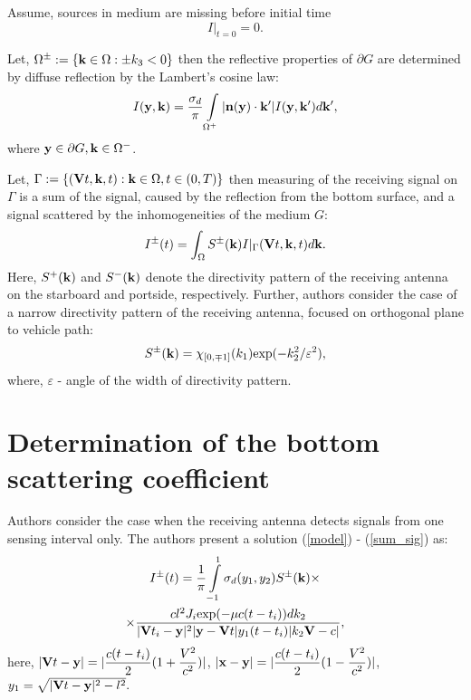 \documentclass{procDDs}
\begin{document}
Assume, sources in medium are missing before initial time
\begin{equation}
	\label{init_cond}
	I\rvert_{t=0}=0.
\end{equation}

Let, $\Omega^\pm := \{\mathbf{k} \in \Omega: \pm k_3 < 0\}$ then the reflective properties of $\partial G$  are determined by diffuse reflection by the Lambert’s cosine law:
\begin{equation}
	\label{boundary_condition}
	I(\mathbf{y},\mathbf{k}) = \frac{\sigma_d}{\pi} \int\limits_{\Omega ^+}|\mathbf{n}(\mathbf{y})\cdot \mathbf{k}'| I(\mathbf{y},\mathbf{k}') d\mathbf{k}' ,
\end{equation}
where  $\mathbf{y} \in \partial G, \mathbf{k} \in \Omega^-$.


Let, $\Gamma := \{ (\mathbf{V}t, \mathbf{k}, t): \mathbf{k} \in \Omega, t \in (0,T) \}$  then measuring of the receiving signal on $\Gamma$ is a sum of the signal, caused by the reflection from the bottom surface, and a signal scattered by the inhomogeneities of the medium $G$:
\begin{multline}
	\label{sum_sig}
	I^\pm(t) = \int_{\Omega} S^\pm(\mathbf{k}) I|_{\Gamma}(\mathbf{V}t, \mathbf{k}, t)d\mathbf{k}.
\end{multline}
Here, $S^+(\mathbf{k})$ and $S^-(\mathbf{k})$ denote the directivity pattern of the receiving antenna on the starboard and portside, respectively. Further, authors consider the case of a narrow directivity pattern of the receiving antenna, focused on orthogonal plane to vehicle path:
\begin{equation}
\label{diagram}
S^\pm(\mathbf{k}) = \chi_{[0,\mp1]}(k_1)  \text{exp}(-k_2^2/\varepsilon^2),
\end{equation}
where, $\varepsilon $ - angle of the width of directivity pattern.

\section{Determination of the bottom scattering coefficient}

Authors consider the case when the receiving antenna detects signals from one sensing interval only. 
The authors present a solution (\ref{model}) - (\ref{sum_sig}) as:
\begin{multline}
	I^\pm(t) = \frac{1}{\pi}\int\limits_{-1}^{1}\sigma_d(y_1,y_2) S^{\pm}(\mathbf{k}) \times \\ \times
	\frac{ cl^2J_i \text{exp}(-\mu c(t-t_i))dk_2}{|\mathbf{V}t_i-\mathbf{y}|^2|\mathbf{y}-\mathbf{V}t|y_1(t-t_i)|k_2 \mathbf{V}-c|},
\end{multline}
here, $|\mathbf{V}t - \mathbf{y}| = |\dfrac{c(t-t_i)}{2}(1+\dfrac{V^2}{c^2})|$, $|\mathbf{x}-\mathbf{y}| = |\dfrac{c(t-t_i)}{2}(1-\dfrac{V^2}{c^2})|$, $y_1 = \sqrt{|\mathbf{V}t-\mathbf{y}|^2 - l^2}.$
\end{document}
